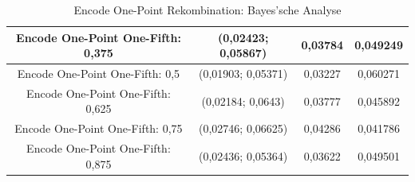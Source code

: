 \begin{table}[H]
\begin{tabular}{c | c | c | c}
		\hline
		Encode One-Point One-Fifth: 0,375 & (0,02423; 0,05867) & 0,03784 & 0,049249\\
		\hline
		Encode One-Point One-Fifth: 0,5 & (0,01903; 0,05371) & 0,03227 & 0,060271\\
		\hline
		Encode One-Point One-Fifth: 0,625 & (0,02184; 0,0643) & 0,03777 & 0,045892\\
		\hline
		Encode One-Point One-Fifth: 0,75 & (0,02746; 0,06625) & 0,04286 & 0,041786\\
		\hline
		Encode One-Point One-Fifth: 0,875 & (0,02436; 0,05364) & 0,03622 & 0,049501\\
	\end{tabular}
	\label{table:encodeOnePointBayesian}
	\caption{Encode One-Point Rekombination: Bayes'sche Analyse}
\end{table}

